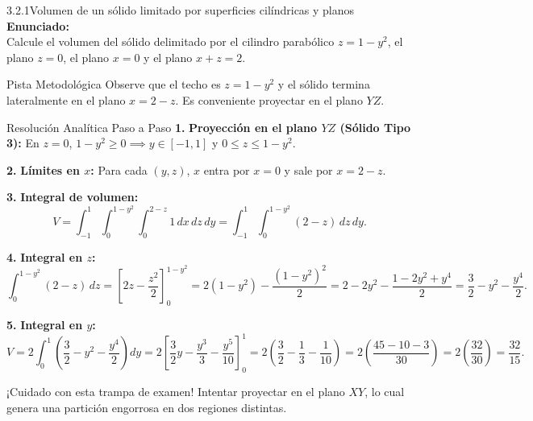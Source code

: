 \documentclass[11pt,a4paper]{article}
\begin{document}
\begin{nivelbox}{3.2.1}{Volumen de un sólido limitado por superficies cilíndricas y planos}
\textbf{Enunciado:}\\
Calcule el volumen del sólido delimitado por el cilindro parabólico $z = 1 - y^2$, el plano $z = 0$, el plano $x = 0$ y el plano $x + z = 2$.

\begin{observacionbox}{Pista Metodológica}
Observe que el techo es $z = 1 - y^2$ y el sólido termina lateralmente en el plano $x = 2 - z$. Es conveniente proyectar en el plano $YZ$.
\end{observacionbox}

\begin{ejerciciobox}{Resolución Analítica Paso a Paso}
\smallskip\noindent\textbf{1.} \textbf{Proyección en el plano $YZ$ (Sólido Tipo 3):}
En $z = 0$, $1 - y^2 \ge 0 \implies y \in [-1, 1]$ y $0 \le z \le 1 - y^2$.

\smallskip\noindent\textbf{2.} \textbf{Límites en $x$:}
Para cada $(y,z)$, $x$ entra por $x = 0$ y sale por $x = 2 - z$.

\smallskip\noindent\textbf{3.} \textbf{Integral de volumen:}
\[V = \int_{-1}^1 \int_0^{1-y^2} \int_0^{2-z} 1 \, dx \, dz \, dy = \int_{-1}^1 \int_0^{1-y^2} (2 - z) \, dz \, dy.\]

\smallskip\noindent\textbf{4.} \textbf{Integral en $z$:}
\[\int_0^{1-y^2} (2 - z) \, dz = \left[ 2z - \frac{z^2}{2} \right]_0^{1-y^2} = 2(1 - y^2) - \frac{(1 - y^2)^2}{2} = 2 - 2y^2 - \frac{1 - 2y^2 + y^4}{2} = \frac{3}{2} - y^2 - \frac{y^4}{2}.\]

\smallskip\noindent\textbf{5.} \textbf{Integral en $y$:}
\[V = 2 \int_0^1 \left( \frac{3}{2} - y^2 - \frac{y^4}{2} \right) dy = 2 \left[ \frac{3}{2}y - \frac{y^3}{3} - \frac{y^5}{10} \right]_0^1 = 2 \left( \frac{3}{2} - \frac{1}{3} - \frac{1}{10} \right) = 2 \left( \frac{45 - 10 - 3}{30} \right) = 2 \left( \frac{32}{30} \right) = \frac{32}{15}.\]
\end{ejerciciobox}

\begin{errorbox}{¡Cuidado con esta trampa de examen!}
Intentar proyectar en el plano $XY$, lo cual genera una partición engorrosa en dos regiones distintas.
\end{errorbox}
\end{nivelbox}
\bigskip
\end{document}
